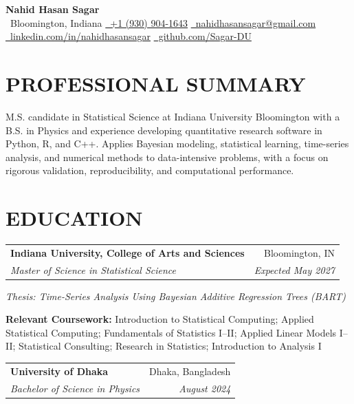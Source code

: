 \documentclass[10pt,letterpaper]{article}
\makeatletter
\newcommand{\resumeEntry}[4]{%
	\begin{tabularx}{\textwidth}{@{}Xr@{}}
		\textbf{#1} & #2 \\
		\textit{#3} & \textit{#4}
	\end{tabularx}%
}
\newcommand{\contactsep}{\qquad}
\makeatother
\begin{document}
\normalsize

\begin{center}
	{\LARGE\textbf{Nahid Hasan Sagar}}\\[2.2pt]
	{\footnotesize
		\faMapMarker*\, Bloomington, Indiana
		\contactsep
		\href{tel:+19309041643}{\faPhone*\, +1 (930) 904-1643}
		\contactsep
		\href{mailto:nahidhasansagar@gmail.com}{\faEnvelope\, nahidhasansagar@gmail.com}
	}\\[-0.2pt]
	{\footnotesize
		\href{https://www.linkedin.com/in/nahidhasansagar/}{\faLinkedinIn\, linkedin.com/in/nahidhasansagar}
		\contactsep
		\href{https://github.com/Sagar-DU}{\faGithub\, github.com/Sagar-DU}
	}
\end{center}

\vspace{-5pt}

\section*{PROFESSIONAL SUMMARY}

M.S. candidate in Statistical Science at Indiana University Bloomington with a B.S. in Physics and experience developing quantitative research software in Python, R, and C++. Applies Bayesian modeling, statistical learning, time-series analysis, and numerical methods to data-intensive problems, with a focus on rigorous validation, reproducibility, and computational performance.

\section*{EDUCATION}

\resumeEntry
	{Indiana University, College of Arts and Sciences}
	{Bloomington, IN}
	{Master of Science in Statistical Science}
	{Expected May 2027}

\vspace{0.4pt}
\textit{Thesis: Time-Series Analysis Using Bayesian Additive Regression Trees (BART)}

\vspace{0.5pt}
\textbf{Relevant Coursework:} Introduction to Statistical Computing; Applied Statistical Computing; Fundamentals of Statistics I--II; Applied Linear Models I--II; Statistical Consulting; Research in Statistics; Introduction to Analysis I

\vspace{2.2pt}
\resumeEntry
	{University of Dhaka}
	{Dhaka, Bangladesh}
	{Bachelor of Science in Physics}
	{August 2024}
\end{document}
